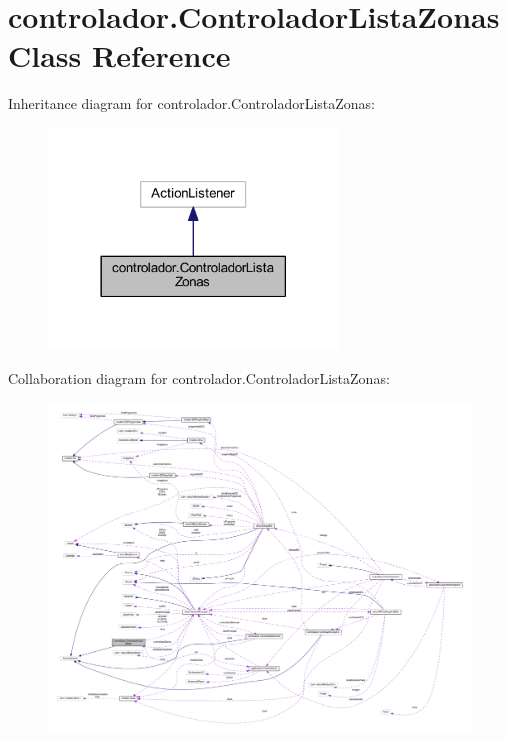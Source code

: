 \hypertarget{classcontrolador_1_1_controlador_lista_zonas}{}\section{controlador.\+Controlador\+Lista\+Zonas Class Reference}
\label{classcontrolador_1_1_controlador_lista_zonas}


Inheritance diagram for controlador.\+Controlador\+Lista\+Zonas\+:
\nopagebreak
\begin{figure}[H]
\begin{center}
\leavevmode
\includegraphics[width=218pt]{classcontrolador_1_1_controlador_lista_zonas__inherit__graph}
\end{center}
\end{figure}


Collaboration diagram for controlador.\+Controlador\+Lista\+Zonas\+:
\nopagebreak
\begin{figure}[H]
\begin{center}
\leavevmode
\includegraphics[width=350pt]{classcontrolador_1_1_controlador_lista_zonas__coll__graph}
\end{center}
\end{figure}
